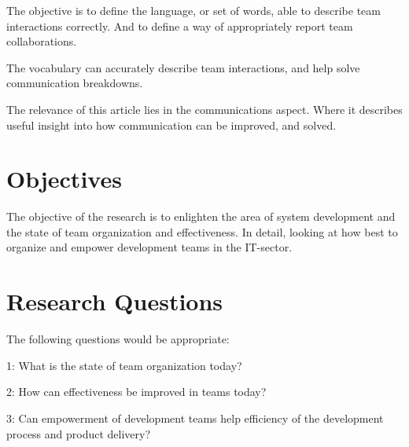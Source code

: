 \documentclass[12pt, a4paper]{article}
\begin{document}
The objective is to define the language, or set of words, able to describe team
interactions correctly. And to define a way of appropriately report team
collaborations.

The vocabulary can accurately describe team interactions, and help solve
communication breakdowns. 

The relevance of this article lies in the communications aspect. Where it
describes useful insight into how communication can be improved, and solved.

\section{Objectives}
The objective of the research is to enlighten the area of system development
and the state of team organization and effectiveness. In detail, looking at how
best to organize and empower development teams in the IT-sector. 

\section{Research Questions}


The following questions would be appropriate:

1: What is the state of team organization today?

2: How can effectiveness be improved in teams today? 

3: Can empowerment of development teams help efficiency of the development process
and product delivery?
\end{document}
